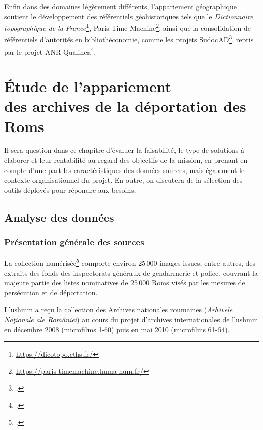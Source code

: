 \documentclass[a4paper,12pt,twoside]{book}
\begin{document}
			 Enfin dans des domaines légèrement différents, l'appariement géographique soutient le développement des référentiels géohistoriques tels que le \textit{Dictionnaire topographique de la France}\footnote{\url{https://dicotopo.cths.fr/}}, Paris Time Machine\footnote{\url{https://paris-timemachine.huma-num.fr/}}, ainsi que la consolidation de référentiels d'autorités en bibliothéconomie, comme les projets SudocAD\footcite{cheinSudocADKnowledgeBasedSystem2014}, repris par le projet ANR Qualinca\footcite[Projet ANR-12-CORD-0012, \url{https://anr.fr/Projet-ANR-12-CORD-0012~:} ][]{ObjectifsQUALINCA}.
		
		
    \pagestyle{empty}
	\cleardoublepage
	\pagestyle{plain}			
	
	\chapter[Mise en œuvre d'outils d'appariement]{Étude de l'appariement \\ \large des archives de la déportation des Roms}
		\label{chap2}
		
		Il sera question dans ce chapitre d'évaluer la faisabilité, le type de solutions à élaborer et leur rentabilité au regard des objectifs de la mission, en prenant en compte d'une part les caractéristiques des données sources, mais également le contexte organisationnel du projet. En outre, on discutera de la sélection des outils déployés pour répondre aux besoins.
	
		\section{Analyse des données}
			
			\subsection{Présentation générale des sources}
			
			    La collection numérisée\footcite{rg-25.050mSelectedRecordsVarious} comporte environ 25\,000 images issues, entre autres, des extraits des fonds des inspectorats généraux de gendarmerie et police, couvrant la majeure partie des listes nominatives de 25\,000 Roms visés par les mesures de persécution et de déportation.
			    
			    L’\gls{ushmm} a reçu la collection des Archives nationales roumaines (\textit{Arhivele Naţionale ale României}) au cours du projet d'archives internationales de l'\gls{ushmm} en décembre 2008 (microfilms 1-60) puis en mai 2010 (microfilms 61-64).
                
\end{document}
